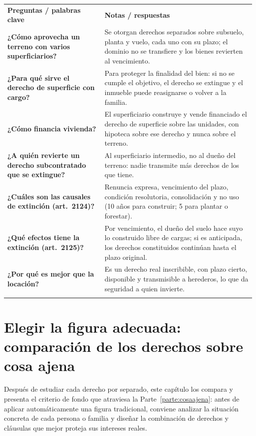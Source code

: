 \documentclass[12pt,oneside]{book}
\newcommand{\cq}[1]{\textbf{#1}}
\newcommand{\cornell}[3]{%
  \par\medskip\noindent\begingroup
  \renewcommand{\arraystretch}{1.25}%
  \begin{tabularx}{\textwidth}{|>{\raggedright\arraybackslash}p{0.27\textwidth}|>{\raggedright\arraybackslash}X|}
    \hline
    \multicolumn{2}{|>{\centering\arraybackslash}X|}{\cellcolor{azulacad!12}\textbf{Cuadro Cornell --- #1}}\\ \hline
    \cellcolor{gray!10}\textbf{Preguntas / palabras clave} & \cellcolor{gray!10}\textbf{Notas / respuestas} \\ \hline
    #2
    \multicolumn{2}{|>{\raggedright\arraybackslash}X|}{\cellcolor{azulacad!6}\textbf{Resumen.} #3}\\ \hline
  \end{tabularx}%
  \endgroup\par\medskip}
\begin{document}
\cornell{Aplicaciones, financiamiento y extinción de la superficie}{
\cq{¿Cómo aprovecha un terreno con varios superficiarios?} & Se otorgan derechos separados sobre subsuelo, planta y vuelo, cada uno con su plazo; el dominio no se transfiere y los bienes revierten al vencimiento. \\ \hline
\cq{¿Para qué sirve el derecho de superficie con cargo?} & Para proteger la finalidad del bien: si no se cumple el objetivo, el derecho se extingue y el inmueble puede reasignarse o volver a la familia. \\ \hline
\cq{¿Cómo financia vivienda?} & El superficiario construye y vende financiado el derecho de superficie sobre las unidades, con hipoteca sobre ese derecho y nunca sobre el terreno. \\ \hline
\cq{¿A quién revierte un derecho subcontratado que se extingue?} & Al superficiario intermedio, no al dueño del terreno: nadie transmite más derechos de los que tiene. \\ \hline
\cq{¿Cuáles son las causales de extinción (art.~2124)?} & Renuncia expresa, vencimiento del plazo, condición resolutoria, consolidación y no uso (10 años para construir; 5 para plantar o forestar). \\ \hline
\cq{¿Qué efectos tiene la extinción (art.~2125)?} & Por vencimiento, el dueño del suelo hace suyo lo construido libre de cargas; si es anticipada, los derechos constituidos continúan hasta el plazo original. \\ \hline
\cq{¿Por qué es mejor que la locación?} & Es un derecho real inscribible, con plazo cierto, disponible y transmisible a herederos, lo que da seguridad a quien invierte. \\ \hline
}{El derecho de superficie multiplica los usos de un terreno, permite financiar vivienda y proteger destinos sociales o familiares, y se extingue por causales legales y pactadas con efectos regulados por los arts.~2124 y 2125. Su ventaja sobre la locación es su naturaleza real; su riesgo, la posible cesión a contrapartes no queridas.}

\chapter{Elegir la figura adecuada: comparación de los derechos sobre cosa ajena}
\label{cap:comparacion}

Después de estudiar cada derecho por separado, este capítulo los compara y presenta el criterio de fondo que atraviesa la Parte~\ref{parte:cosaajena}: antes de aplicar automáticamente una figura tradicional, conviene analizar la situación concreta de cada persona o familia y diseñar la combinación de derechos y cláusulas que mejor proteja sus intereses reales.
\end{document}
